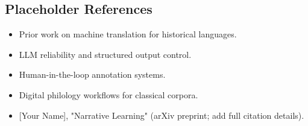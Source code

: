 \documentclass[
]{article}
\providecommand{\tightlist}{%
  \setlength{\itemsep}{0pt}\setlength{\parskip}{0pt}}
\begin{document}
\hypertarget{placeholder-references}{%
\subsection{Placeholder References}\label{placeholder-references}}

\begin{itemize}
\tightlist
\item
  Prior work on machine translation for historical languages.
\item
  LLM reliability and structured output control.
\item
  Human-in-the-loop annotation systems.
\item
  Digital philology workflows for classical corpora.
\item
  {[}Your Name{]}, "Narrative Learning" (arXiv preprint; add full
  citation details).
\end{itemize}
\end{document}
